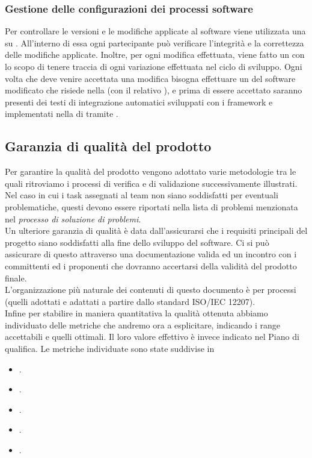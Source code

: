 \subsubsection{Gestione delle configurazioni dei processi software}
Per controllare le versioni e le modifiche applicate al software viene utilizzata una  su . All'interno di essa ogni partecipante può verificare l'integrità e la correttezza delle modifiche applicate. Inoltre, per ogni modifica effettuata, viene fatto un  con lo scopo di tenere traccia di ogni variazione effettuata nel ciclo di sviluppo. Ogni volta che deve venire accettata una modifica bisogna effettuare un 	 del software modificato che risiede nella  (con il relativo ), e prima di essere accettato saranno presenti dei testi di integrazione automatici sviluppati con i framework  e  implementati nella  di  tramite .

\subsection{Garanzia di qualità del prodotto}
Per garantire la qualità del prodotto vengono adottato varie metodologie tra le quali ritroviamo i processi di verifica e di validazione successivamente illustrati. \\
Nel caso in cui i task assegnati al team non siano soddisfatti per eventuali problematiche, questi devono essere riportati nella lista di problemi menzionata nel \textit{processo di soluzione di problemi}. \\
Un ulteriore garanzia di qualità è data dall'assicurarsi che i requisiti principali del progetto siano soddisfatti alla fine dello sviluppo del software. Ci si può assicurare di questo attraverso una documentazione valida ed un incontro con i committenti ed i proponenti che dovranno accertarsi della validità del prodotto finale. \\
L'organizzazione più naturale dei contenuti di questo documento è per processi (quelli adottati e adattati a partire dallo standard ISO/IEC 12207).\\
Infine per stabilire in maniera quantitativa la qualità ottenuta abbiamo individuato delle metriche che andremo ora a esplicitare, indicando i range accettabili e quelli ottimali. Il loro valore effettivo è invece indicato nel Piano di qualifica.
Le metriche individuate sono state suddivise in
\begin{itemize}
	\item\textbf{}.
	\item\textbf{}.
	\item\textbf{}.
	\item\textbf{}.
	\item\textbf{}.
\end{itemize}

